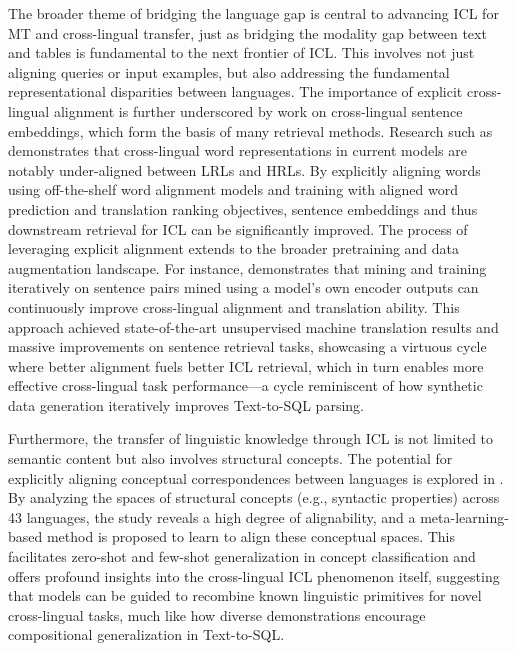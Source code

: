 \documentclass[11pt]{article}
\begin{document}
The broader theme of bridging the language gap is central to advancing ICL for MT and cross-lingual transfer, just as bridging the modality gap between text and tables is fundamental to the next frontier of ICL. This involves not just aligning queries or input examples, but also addressing the fundamental representational disparities between languages. The importance of explicit cross-lingual alignment is further underscored by work on cross-lingual sentence embeddings, which form the basis of many retrieval methods. Research such as \cite{ref540} demonstrates that cross-lingual word representations in current models are notably under-aligned between LRLs and HRLs. By explicitly aligning words using off-the-shelf word alignment models and training with aligned word prediction and translation ranking objectives, sentence embeddings and thus downstream retrieval for ICL can be significantly improved. The process of leveraging explicit alignment extends to the broader pretraining and data augmentation landscape. For instance, \cite{ref541} demonstrates that mining and training iteratively on sentence pairs mined using a model's own encoder outputs can continuously improve cross-lingual alignment and translation ability. This approach achieved state-of-the-art unsupervised machine translation results and massive improvements on sentence retrieval tasks, showcasing a virtuous cycle where better alignment fuels better ICL retrieval, which in turn enables more effective cross-lingual task performance---a cycle reminiscent of how synthetic data generation iteratively improves Text-to-SQL parsing.

Furthermore, the transfer of linguistic knowledge through ICL is not limited to semantic content but also involves structural concepts. The potential for explicitly aligning conceptual correspondences between languages is explored in \cite{ref542}. By analyzing the spaces of structural concepts (e.g., syntactic properties) across 43 languages, the study reveals a high degree of alignability, and a meta-learning-based method is proposed to learn to align these conceptual spaces. This facilitates zero-shot and few-shot generalization in concept classification and offers profound insights into the cross-lingual ICL phenomenon itself, suggesting that models can be guided to recombine known linguistic primitives for novel cross-lingual tasks, much like how diverse demonstrations encourage compositional generalization in Text-to-SQL.
\end{document}
